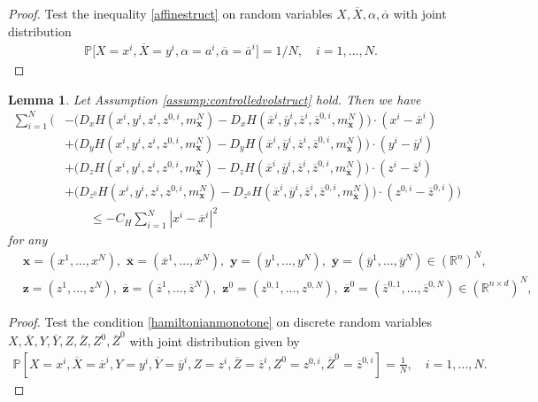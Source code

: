 \documentclass[11pt,reqno]{amsart}
\numberwithin{equation}{section}
\newtheorem{lemma}[theorem]{Lemma}
\theoremstyle{definition}
\def\R{{\mathbb R}}
\newcommand{\bx}{\mathbf{x}}
\newcommand{\by}{\mathbf{y}}
\newcommand{\bP}{\mathbb{P}}
\newcommand{\ov}{\overline}
\def \R{\mathbb{R}}
\newcommand{\bz}{\bm z}
\begin{document}
\begin{proof}
Test the inequality \eqref{affinestruct} on random variables $X, \ov{X}, \alpha, \ov{\alpha}$ with joint distribution 
\begin{align*}
\bP \big[ X = x^i, \ov{X}= y^i, \alpha = a^i, \ov{\alpha} = \ov{a}^i \big] = 1/N, \quad i = 1,\dots,N.
\end{align*}
\end{proof}


\begin{lemma} \label{lem:finitedimmonotone}
    Let Assumption \ref{assump:controlledvolstruct} hold. Then
    we have 
    \begin{align*}
        \sum_{i = 1}^N \bigg( &- \big(D_x H(x^i,y^i,z^i,z^{0,i},m_{\bx}^N) - D_x H(\ov{x}^i,\ov{y}^i,\ov{z}^i,\ov{z}^{0,i},m_{\ov{\bx}}^N) \big) \cdot (x^i - \ov{x}^i) 
        \\
        &+  \big(D_y H(x^i,y^i,z^i,z^{0,i},m_{\bx}^N) - D_y H(\ov{x}^i,\ov{y}^i,\ov{z}^i,\ov{z}^{0,i}, m_{\ov{\bx}}^N) \big)\cdot (y^i - \ov{y}^i) 
        \\
         &+  \big(D_z H(x^i,y^i,z^i,z^{0,i},m_{\bx}^N) - D_z H(\ov{x}^i,\ov{y}^i,\ov{z}^i,\ov{z}^{0,i},m_{\ov{\bx}}^N) \big) \cdot (z^i - \ov{z}^i)
         \\
         &+  \big(D_{z^0} H(x^i,y^i,z^i,z^{0,i},m_{\bx}^N) - D_{z^0} H(\ov{x}^i,\ov{y}^i,\ov{z}^i,\ov{z}^{0,i},m_{\ov{\bx}}^N) \big)  \cdot (z^{0,i} - \ov{z}^{0,i})  \bigg) \\
         &\qquad \leq - C_H \sum_{i = 1}^N |x^i - \ov{x}^i|^2
    \end{align*}
    for any 
    \begin{align*}
        &\bx = (x^1,\dots,x^N), \,\, \ov{\bx} = (\ov{x}^1,\dots,\ov{x}^N), \,\, \by = (y^1,\dots,y^N), \,\, \ov{\by} = (\ov{y}^1,\dots,\ov{y}^N) \in (\R^n)^N, \\
        &\bz = (z^1,\dots,z^N), \,\, \ov{\bz} = (\ov{z}^1,\dots,\ov{z}^N), \,\, \bz^0 = (z^{0,1},\dots,z^{0,N}), \,\, \ov{\bz}^0 = (\ov{z}^{0,1},\dots,\ov{z}^{0,N}) \in (\R^{n \times d})^N, 
    \end{align*}
\end{lemma}

\begin{proof}
    Test the condition \eqref{hamiltonianmonotone} on discrete random variables $X,\ov{X}, Y, \ov{Y}, Z, \ov{Z} ,Z^0, \ov{Z}^0$ with joint distribution given by
    \begin{align*}
        \bP[X = x^i, \ov{X} = \ov{x}^i, Y = y^i, \ov{Y} = \ov{y}^i, Z = z^i, \ov{Z} = \ov{z}^i, Z^0 = z^{0,i}, \ov{Z}^0 = \ov{z}^{0,i}] = \frac{1}{N}, \quad i = 1,\dots,N.
    \end{align*}
\end{proof}
\end{document}
